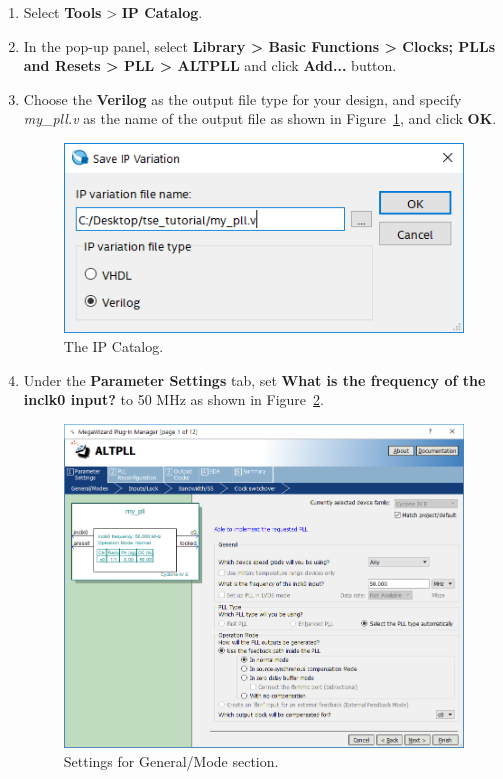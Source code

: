 \documentclass[11pt, twoside, pdftex]{article}
\begin{document}
\begin{enumerate}
	\item Select {\bf Tools} > {\bf IP Catalog}. %
	\item In the pop-up panel, select {\bf Library > Basic Functions > Clocks; PLLs and Resets > PLL > ALTPLL} and click {\bf Add...} button.
	\item Choose the {\bf Verilog} as the output file type for your design, and specify {\it my\_pll.v} as the name of the output file as shown in Figure~\ref{fig:pll_settings1}, and click {\bf OK}.
	
	\begin{figure}[H]
		\centering
		  \includegraphics[scale=0.65]{figures/pll_settings1.png}
		\caption{The IP Catalog.} 
		\label{fig:pll_settings1}
	\end{figure}

	\item Under the {\bf Parameter Settings} tab, set {\bf What is the frequency of the inclk0 input?} to 50 MHz as shown in Figure~\ref{fig:pll_settings2}.
	
	\begin{figure}[H]
		\centering
		  \includegraphics[scale=0.6]{figures/pll_settings2.png}
		\caption{Settings for General/Mode section.} 
		\label{fig:pll_settings2}
	\end{figure}
	

\end{enumerate}
\end{document}
